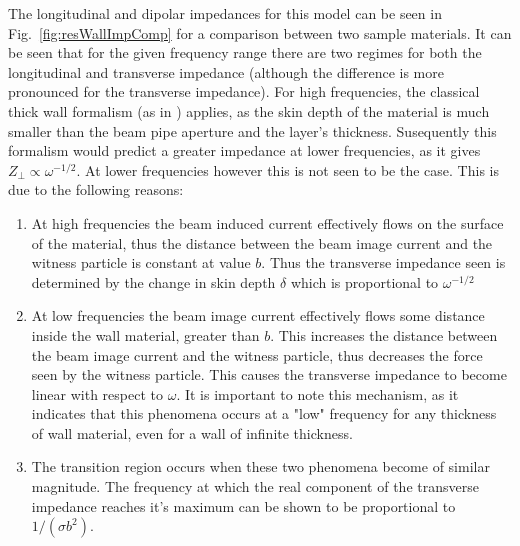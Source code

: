 The longitudinal and dipolar impedances for this model can be seen in Fig.~\ref{fig:resWallImpComp} for a comparison between two sample materials. It can be seen that for the given frequency range there are two regimes for both the longitudinal and transverse impedance (although the difference is more pronounced for the transverse impedance). For high frequencies, the classical thick wall formalism (as in \cite{Chao:PhysColEff}) applies, as the skin depth of the material is much smaller than the beam pipe aperture and the layer's thickness. Susequently this formalism would predict a greater impedance at lower frequencies, as it gives $Z_{\perp} \propto \omega^{-1/2}$. At lower frequencies however this is not seen to be the case. This is due to the following reasons:

\begin{enumerate}
\item{At high frequencies the beam induced current effectively flows on the surface of the material, thus the distance between the beam image current and the witness particle is constant at value $b$. Thus the transverse impedance seen is determined by the change in skin depth $\delta$ which is proportional to $\omega^{-1/2}$}
\item{At low frequencies the beam image current effectively flows some distance inside the wall material, greater than $b$. This increases the distance between the beam image current and the witness particle, thus decreases the force seen by the witness particle. This causes the transverse impedance to become linear with respect to $\omega$. It is important to note this mechanism, as it indicates that this phenomena occurs at a "low" frequency for any thickness of wall material, even for a wall of infinite thickness.}
\item{The transition region occurs when these two phenomena become of similar magnitude. The frequency at which the real component of the transverse impedance reaches it's maximum can be shown to be proportional to $1/(\sigma b^{2})$.}
\end{enumerate}

